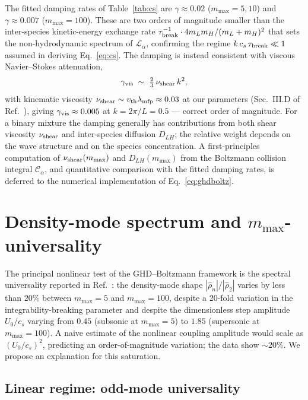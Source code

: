 \documentclass[aps,pre,twocolumn,superscriptaddress,longbibliography,floatfix]{revtex4-2}
\begin{document}
The fitted damping rates of Table~\ref{tab:cs} are
$\gamma\approx 0.02$ ($m_{\max}=5,10$) and $\gamma\approx 0.007$
($m_{\max}=100$). These are two orders of magnitude smaller
than the inter-species kinetic-energy exchange rate
$\tau_{\rm break}^{-1}\cdot 4 m_L m_H/(m_L+m_H)^2$ that sets
the non-hydrodynamic spectrum of $\mathcal{L}_\alpha$,
confirming the regime $k\,c_s\,\tau_{\rm break}\ll 1$ assumed in
deriving Eq.~\eqref{eq:cs}. The damping is instead consistent
with viscous Navier--Stokes attenuation,
\begin{equation}
\gamma_{\rm vis} \;\sim\; \tfrac{2}{3}\,\nu_{\rm shear}\,k^2,
\label{eq:gammavis}
\end{equation}
with kinematic viscosity $\nu_{\rm shear}\sim v_{\rm th}
\lambda_{\rm mfp}\approx 0.03$ at our parameters (Sec.~III.D of
Ref.~\cite{PaperIII}), giving $\gamma_{\rm vis}\approx 0.005$ at
$k=2\pi/L=0.5$ --- correct order of magnitude. For a binary mixture the damping
generally has contributions from both shear viscosity
$\nu_{\rm shear}$ and inter-species diffusion $D_{LH}$; the
relative weight depends on the wave structure and on the
species concentration. A first-principles computation of
$\nu_{\rm shear}(m_{\max})$ and $D_{LH}(m_{\max})$ from the
Boltzmann collision integral $\mathcal{C}_\alpha$, and
quantitative comparison with the fitted damping rates, is
deferred to the numerical implementation of
Eq.~\eqref{eq:ghdboltz}.

\section{Density-mode spectrum and $m_{\max}$-universality}
\label{sec:nonlinear}

The principal nonlinear test of the GHD--Boltzmann framework is
the spectral universality reported in
Ref.~\cite{PaperIII}: the density-mode shape
$|\hat\rho_n|/|\hat\rho_2|$ varies by less than $20\%$
between $m_{\max}=5$ and $m_{\max}=100$, despite a 20-fold
variation in the integrability-breaking parameter and despite
the dimensionless step amplitude $U_0/c_s$ varying from $0.45$
(subsonic at $m_{\max}=5$) to $1.85$ (supersonic at $m_{\max}=100$).
A naive estimate of the nonlinear coupling amplitude would
scale as $(U_0/c_s)^2$, predicting an order-of-magnitude
variation; the data show $\sim 20\%$. We propose an explanation
for this saturation.

\subsection{Linear regime: odd-mode universality}
\end{document}
